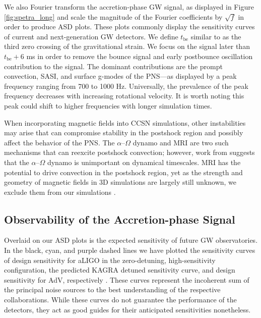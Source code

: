 \documentclass[twocolumn,times]{aastex62}  %
\begin{document}
We also Fourier transform the accretion-phase GW signal, as displayed in Figure \ref{fig:spetra_long} and scale the magnitude of the Fourier coefficients by $\sqrt{f}$ in order to produce ASD plots.  These plots commonly display the sensitivity curves of current and next-generation GW detectors.  We define $t_{\mathrm{be}}$ similar to \citet{richers:2017} as the third zero crossing of the gravitational strain.  We focus on the signal later than $t_{\mathrm{be}} + 6$ ms in order to remove the bounce signal and early postbounce oscillation contribution to the signal.  
The dominant contributions are the prompt convection, SASI, and surface g-modes of the PNS---as displayed by a peak frequency ranging from 700 to 1000 Hz.  Universally, the prevalence of the peak frequency decreases with increasing rotational velocity.  It is worth noting this peak could shift to higher frequencies with longer simulation times.

When incorporating magnetic fields into CCSN simulations, other instabilities may arise that can compromise stability in the postshock region and possibly affect the behavior of the PNS.  The $\alpha$--$\Omega$ dynamo and MRI are two such mechanisms that can reexcite postshock convection; however, work from \citet{bonanno:2005} suggests that the $\alpha$--$\Omega$ dynamo is unimportant on dynamical timescales.   MRI has the potential to drive convection in the postshock region, yet as the strength and geometry of magnetic fields in 3D simulations are largely still unknown, we exclude them from our simulations \citep{cerda-duran:2007}.

\subsection{Observability of the Accretion-phase Signal}

Overlaid on our ASD plots is the expected sensitivity of future GW observatories.  
In the black, cyan, and purple dashed lines we have plotted the sensitivity curves of design sensitivity for aLIGO in the zero-detuning, high-sensitivity configuration, the predicted KAGRA detuned sensitivity curve, and design sensitivity for AdV, respectively \citep{komori:2017,abbott:2018,barsotti:2018}.
These curves represent the incoherent sum of the principal noise sources to the best understanding of the respective collaborations.  While these curves do not guarantee the performance of the detectors, they act as good guides for their anticipated sensitivities nonetheless. 
\end{document}
